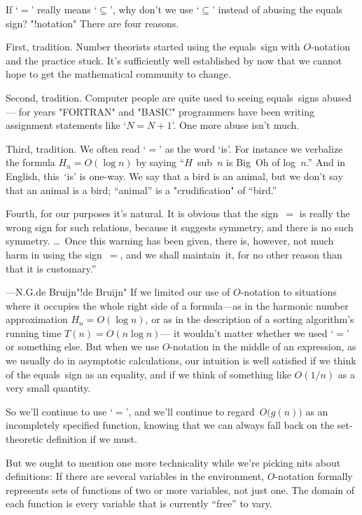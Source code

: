 If `$=$' really means `$\subseteq$',
why don't we use `$\subseteq$'
instead of abusing the equals sign?
"!notation"
There are four reasons.

First, tradition.
Number theorists started using the equals~sign
with $O$-notation and the practice stuck.
It's sufficiently well established by now that
we cannot hope to get the mathematical community to change.

Second, tradition.
Computer people are quite used to seeing equals~signs abused\dash---%
for years "FORTRAN" and "BASIC" programmers have been writing
assignment statements like `$N = N+1$'.
One more abuse isn't much.

Third, tradition.
We often read `$=$' as the word `is'.
For instance we verbalize the formula $H_n = O(\log n)$ by saying
``$H$~sub~$n$ is Big~Oh of log~$n$.\qback''
And in English, this~`is' is one-way.
We say that a bird is an animal,
but we don't say that an animal is a bird;
``animal'' is a "crudification" of ``bird.\qback''

Fourth, for our purposes it's natural.
\g \noindent{}It is obvious that the sign\/~$=$ is really the wrong sign
for such relations, because it suggests symmetry, and there is
no such symmetry. \dots\ Once this warning has been given, there is,
however, not much harm in using the sign\/~$=$, and we shall maintain~it,
for no other reason than that it is customary.''\par
\hfill\kern-4pt\dash---N.\thinspace G.\thinspace de\thinspace
  Bruijn\thinspace [|de-bruijn|]"!de Bruijn"\g
If we limited our use of $O$-notation to situations where
it occupies the whole right side of a formula\dash---as in
the harmonic number approximation $H_n = O(\log n)$,
or as in the description of a sorting algorithm's
running time $T(n) = O (n \log n)$\dash---%
it wouldn't matter whether we used `$=$'
or something else.
But when we use $O$-notation in the middle of an expression,
as we usually do in asymptotic calculations,
our intuition is well satisfied if we think of
the equals~sign as an equality, and if we
think of something like $O(1/n)$ as a very small quantity.

So we'll continue to use `$=$',
and we'll continue to regard~$O\bigl(g(n)\bigr)$ as
an incompletely specified function,
knowing that we can always fall back on the
set-theoretic definition if we must.

But we ought to mention one more technicality while we're picking nits
about definitions: If there are several variables in the environment,
$O$-notation formally represents sets of functions of two or more
variables, not just one. The domain of each function is every variable
that is currently ``free'' to vary.

